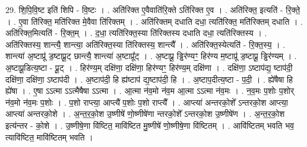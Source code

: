\documentclass[17pt]{extarticle}
\begin{document}
29. शि॒पि॒वि॒ष्ट इति॑ शिपि - वि॒ष्टः । . अति॑रिक्त ए॒वैवाति॑रि॒क्ते ऽति॑रिक्त ए॒व । . अति॑रिक्त॒ इत्यति॑ - रि॒क्ते॒ । . ए॒वा ति॑रिक्त॒ मति॑रिक्त मे॒वैवा ति॑रिक्तम् । . अति॑रिक्तम् दधाति दधा॒ त्यति॑रिक्त॒ मति॑रिक्तम् दधाति । . अति॑रिक्त॒मित्यति॑ - रि॒क्त॒म् । . द॒धा॒ त्यति॑रिक्त॒स्या ति॑रिक्तस्य दधाति दधा॒ त्यति॑रिक्तस्य । . अति॑रिक्तस्य॒ शान्त्यै॒ शान्त्या॒ अति॑रिक्त॒स्या ति॑रिक्तस्य॒ शान्त्यै᳚ । . अति॑रिक्त॒स्येत्यति॑ - रि॒क्त॒स्य॒ । . शान्त्या॑ अ॒ष्टाप्रू॑ ड॒ष्टाप्रू॒ट् छान्त्यै॒ शान्त्या॑ अ॒ष्टाप्रू᳚ट् । . अ॒ष्टाप्रू॒ ड्ढिर॑ण्यꣳ॒॒ हिर॑ण्य म॒ष्टाप्रू॑ ड॒ष्टाप्रू॒ ड्ढिर॑ण्यम् । . अ॒ष्टाप्रू॒डित्य॒ष्टा - प्रू॒ट् । . हिर॑ण्य॒म् दक्षि॑णा॒ दक्षि॑णा॒ हिर॑ण्यꣳ॒॒ हिर॑ण्य॒म् दक्षि॑णा । . दक्षि॑णा॒ ऽष्टाप॑द्य॒ ष्टाप॑दी॒ दक्षि॑णा॒ दक्षि॑णा॒ ऽष्टाप॑दी । . अ॒ष्टाप॑दी॒ हि ह्य॑ष्टाप॑ द्य॒ष्टाप॑दी॒ हि । . अ॒ष्टाप॒दीत्य॒ष्टा - प॒दी॒ । . ह्ये॑षैषा हि ह्ये॑षा । . ए॒षा ऽऽत्मा ऽऽत्मैषैषा ऽऽत्मा । . आ॒त्मा न॑व॒मो न॑व॒म आ॒त्मा ऽऽत्मा न॑व॒मः । . न॒व॒मः प॒शोः प॒शोर् न॑व॒मो न॑व॒मः प॒शोः । . प॒शो राप्त्या॒ आप्त्यै॑ प॒शोः प॒शो राप्त्यै᳚ । . आप्त्या॑ अन्तरको॒शे᳚ ऽन्तरको॒श आप्त्या॒ आप्त्या॑ अन्तरको॒शे । . अ॒न्त॒र॒को॒श उ॒ष्णीषे॑ णो॒ष्णीषे॑णा न्तरको॒शे᳚ ऽन्तरको॒श उ॒ष्णीषे॑ण । . अ॒न्त॒र॒को॒श इत्य॑न्तर - को॒शे । . उ॒ष्णीषे॒णा वि॑ष्टित॒ मावि॑ष्टित मु॒ष्णीषे॑ णो॒ष्णीषे॒णा वि॑ष्टितम् । . आवि॑ष्टितम् भवति भव॒ त्यावि॑ष्टित॒ मावि॑ष्टितम् भवति । \newline
\end{document}
